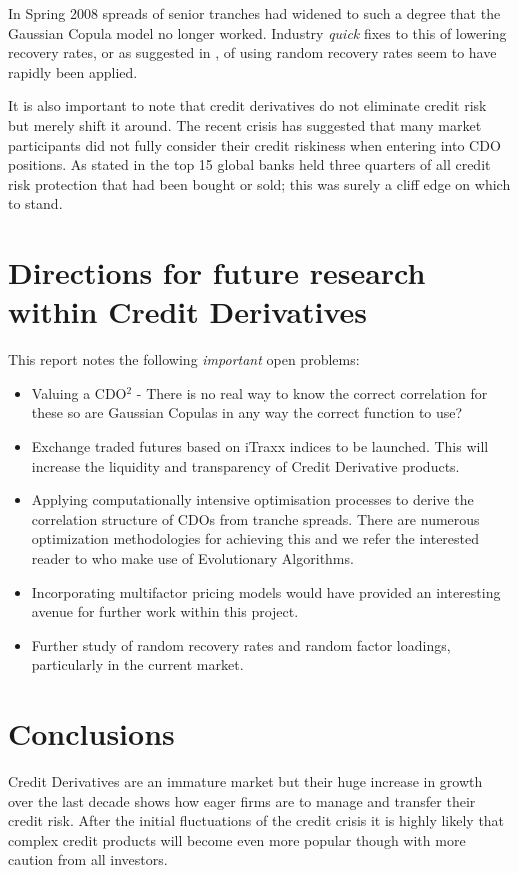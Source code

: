 \medskip
In Spring 2008 spreads of senior tranches had widened to such a degree that the Gaussian Copula model no longer worked.  Industry {\em quick} fixes to this of lowering recovery rates, or as suggested in \cite{Kre2008,AH2008}, of using random recovery rates seem to have rapidly been applied.

It is also important to note that credit derivatives do not eliminate credit risk but merely shift it around. The recent crisis has suggested that many market participants did not fully consider their credit riskiness when entering into CDO positions. As stated in \cite{bv2005} the top 15 global banks held three quarters of all credit risk protection that had been bought or sold; this was surely a cliff edge on which to stand.


\section{Directions for future research within Credit Derivatives}


This report notes the following {\em important} open problems:
\begin{itemize}
\item Valuing a CDO$^2$ - There is no real way to know the correct correlation for these so are Gaussian Copulas in any way the correct function to use? 
\item Exchange traded futures based on iTraxx indices to be launched.  This will increase the liquidity and transparency of Credit Derivative products.
\item Applying computationally intensive optimisation processes to derive the correlation structure of CDOs from tranche spreads. There are numerous optimization methodologies for achieving this and we refer the interested reader to \cite{hs2006} who make use of Evolutionary Algorithms.
\item Incorporating multifactor pricing models would have provided an interesting avenue for further work within this project.
\item Further study of random recovery rates and random factor loadings, particularly in the current market.
\end{itemize}

\section{Conclusions}

Credit Derivatives are an immature market \cite{Gib2007} but their huge increase in growth over the last decade shows how eager firms are to manage and transfer their credit risk.  After the initial fluctuations of the credit crisis it is highly likely that complex credit products will become even more popular though with more caution from all investors.

